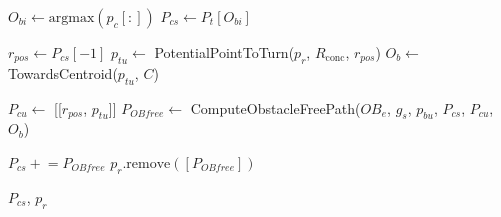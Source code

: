 \begin{algorithm}[H]
\begin{algorithmic}[1]
    \State $O_{bi} \leftarrow \text{argmax}(p_c[:])$
    \State $P_{cs} \leftarrow P_t[O_{bi}]$
    
    \State $r_{pos} \leftarrow P_{cs}[-1]$
    \State $p_{tu} \leftarrow$ PotentialPointToTurn($p_r$, $R_{\text{conc}}$, $r_{pos}$)
    \State $O_b \leftarrow$ TowardsCentroid($p_{tu}$, $C$)

    \State $P_{cu} \leftarrow$ [[$r_{pos}$, $p_{tu}$]]
    \State $P_{OB free} \leftarrow$ ComputeObstacleFreePath($OB_e$, $g_s$, $p_{bu}$, $P_{cs}$, $P_{cu}$, $O_b$)

    \State $P_{cs} \mathrel{+}= P_{OB free}$
    \State $p_r.\text{remove}([P_{OB free}])$ 
    
    \State \Return $P_{cs}$, $p_r$
    \end{algorithmic}
    \end{algorithm}




    









